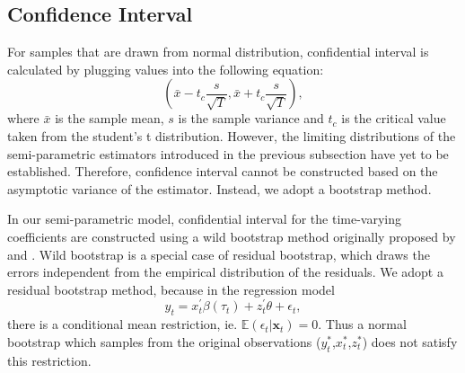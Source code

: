 \documentclass[12pt,a4paper]{article}
\begin{document}
%	
%	
%	
%	
%	
\subsection{Confidence Interval}

For samples that are drawn from normal distribution, confidential interval is calculated by plugging values into the following equation:
$$\left(\bar{x}-t_c \frac{s}{\sqrt{T}}, \bar{x}+t_c \frac{s}{\sqrt{T}}\right),$$
where $\bar{x}$ is the sample mean, $s$ is the sample variance and $t_c$ is the critical value taken from the student's t distribution. However, the limiting distributions of the semi-parametric estimators introduced in the previous subsection have yet to be established. Therefore, confidence interval cannot be constructed based on the asymptotic variance of the estimator. Instead, we adopt a bootstrap method.

In our semi-parametric model, confidential interval for the time-varying coefficients are constructed using a wild bootstrap method originally proposed by \cite{liu1988bootstrap} and \cite{mammen1993bootstrap}. Wild bootstrap is a special case of residual bootstrap, which draws the errors independent from the empirical distribution of the residuals. We adopt a residual bootstrap method, because in the regression model
$$
y_t = x^{\prime}_{t}\beta(\tau_{t}) +z_t^{\prime}\theta +\epsilon_t,
$$
there is a conditional mean restriction, ie. $\mathbb{E}\left(\epsilon_{t} | \boldsymbol{x}_{t}\right)=0$. Thus a normal bootstrap which samples from the original observations ($y^{*}_t$,$x^{*}_t$,$z^{*}_t$) does not satisfy this restriction. 
\end{document}
